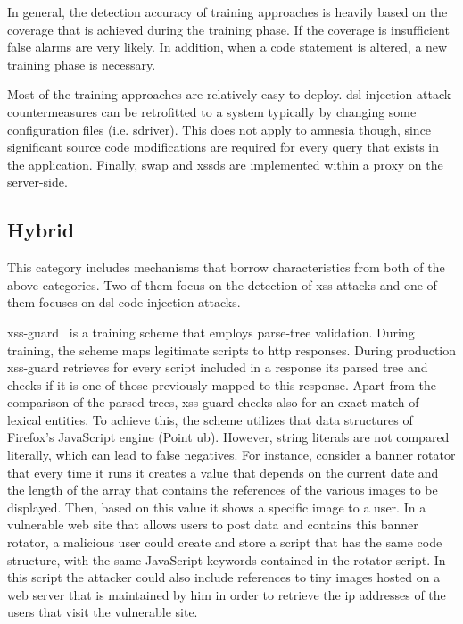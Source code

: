 \documentclass[conference]{IEEEtran}
\begin{document}
In general, the detection accuracy of training approaches is heavily
based on the coverage that is achieved during the training phase. If
the coverage is insufficient false alarms are very likely. In
addition, when a code statement is altered, a new training phase is
necessary.

Most of the training approaches are relatively easy to deploy.
{\sc dsl} injection attack countermeasures
can be retrofitted to a system typically by changing
some configuration files (i.e. {\sc sd}river). This does not apply
to {\sc amnesia} though, since significant source code
modifications are required for every query that exists
in the application. Finally, {\sc swap} and {\sc xssds}
are implemented within a proxy on the server-side.

\subsection{Hybrid}
\label{sec:hybrid}

This category includes mechanisms that borrow
characteristics from both of the above categories.
Two of them focus on the detection of {\sc xss}
attacks and one of them focuses on {\sc dsl} code
injection attacks.

{\sc xss-guard}~\cite{BV08} is a training scheme that employs
parse-tree validation. During training, the scheme maps legitimate
scripts to {\sc http} responses. During production {\sc xss-guard}
retrieves for every script included in a response its parsed tree and
checks if it is one of those previously mapped to this response. Apart
from the comparison of the parsed trees, {\sc xss-guard} checks also
for an exact match of lexical entities. To achieve this, the scheme
utilizes that data structures of Firefox's JavaScript engine (Point
{\sc ub}). However, string literals are not compared literally, which
can lead to false negatives. For instance, consider a banner rotator
that every time it runs it creates a value that depends on the
current date and the length of the array that contains the references
of the various images to be displayed. Then, based on this value it
shows a specific image to a user. In a vulnerable web site that allows
users to post data and contains this banner rotator, a malicious user
could create and store a script that has the same code structure, with
the same JavaScript keywords contained in the rotator script.
In this script the attacker could also include references to tiny
images hosted on a web server that is maintained by him in order to
retrieve the {\sc ip} addresses of the users that visit the vulnerable
site.
\end{document}
